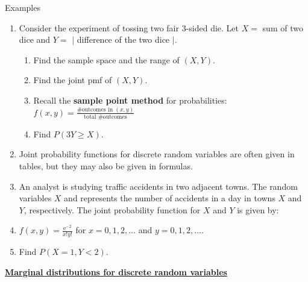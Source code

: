\documentclass{article}
\newcommand{\bu}[1]{\textbf{\ul{#1}}}				%
\newcommand{\e}{\mathrm{e}}		%
\begin{document}
Examples\bigskip
\begin{enumerate}
    \item Consider the experiment of tossing two fair 3-sided die. Let $X = $ sum of two dice and $Y = $ $\lvert$ difference of the two dice $\rvert$.
    \begin{enumerate}
        \item Find the sample space and the range of $(X,Y)$.\vspace{100pt}
        \item Find the joint pmf of $(X,Y)$.
        \item[] Recall the \textbf{sample point method} for probabilities: $f(x,y) = \frac{\text{\# outcomes in } (x,y)}{\text{total \# outcomes}}$\vspace{170pt}
        \item Find $P(3Y \ge X)$.\vspace{70pt}
    \end{enumerate}
    \item Joint probability functions for discrete random variables are often given in tables, but they may also be given in formulas.
    \item[] An analyst is studying traffic accidents in two adjacent towns. The random variables $X$ and represents the number of accidents in a day in towns $X$ and $Y$, respectively. The joint probability function for $X$ and $Y$ is given by:
    \item[] $f(x,y) =  \frac{\e^{-2}}{x!y!}$ \quad for $x = 0, 1, 2, \ldots$ and $y = 0, 1, 2, \ldots$.
    \item[] Find $P(X = 1, Y < 2)$.\vspace{100pt}
\end{enumerate}\bigskip

\bu{Marginal distributions for discrete random variables}\bigskip
\end{document}
